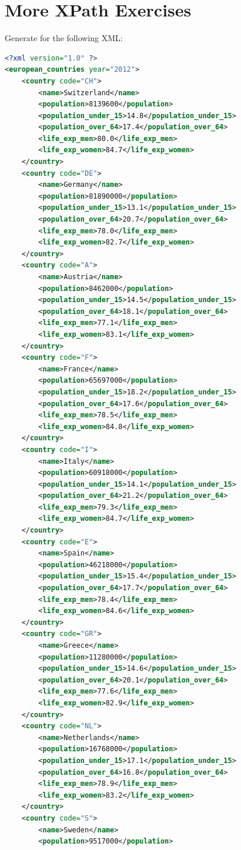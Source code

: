 \section{More XPath Exercises}
Generate for the following XML:
\begin{center}
\begin{lstlisting}[language=XML]
<?xml version="1.0" ?>
<european_countries year="2012">
	<country code="CH">
		<name>Switzerland</name>
		<population>8139600</population>
		<population_under_15>14.8</population_under_15>
		<population_over_64>17.4</population_over_64>
		<life_exp_men>80.0</life_exp_men>
		<life_exp_women>84.7</life_exp_women>
	</country>
	<country code="DE">
		<name>Germany</name>
		<population>81890000</population>
		<population_under_15>13.1</population_under_15>
		<population_over_64>20.7</population_over_64>
		<life_exp_men>78.0</life_exp_men>
		<life_exp_women>82.7</life_exp_women>
	</country>
	<country code="A">
		<name>Austria</name>
		<population>8462000</population>
		<population_under_15>14.5</population_under_15>
		<population_over_64>18.1</population_over_64>
		<life_exp_men>77.1</life_exp_men>
		<life_exp_women>83.1</life_exp_women>
	</country>
	<country code="F">
		<name>France</name>
		<population>65697000</population>
		<population_under_15>18.2</population_under_15>
		<population_over_64>17.6</population_over_64>
		<life_exp_men>78.5</life_exp_men>
		<life_exp_women>84.8</life_exp_women>
	</country>
	<country code="I">
		<name>Italy</name>
		<population>60918000</population>
		<population_under_15>14.1</population_under_15>
		<population_over_64>21.2</population_over_64>
		<life_exp_men>79.3</life_exp_men>
		<life_exp_women>84.7</life_exp_women>
	</country>
	<country code="E">
		<name>Spain</name>
		<population>46218000</population>
		<population_under_15>15.4</population_under_15>
		<population_over_64>17.7</population_over_64>
		<life_exp_men>78.4</life_exp_men>
		<life_exp_women>84.6</life_exp_women>
	</country>
	<country code="GR">
		<name>Greece</name>
		<population>11280000</population>
		<population_under_15>14.6</population_under_15>
		<population_over_64>20.1</population_over_64>
		<life_exp_men>77.6</life_exp_men>
		<life_exp_women>82.9</life_exp_women>
	</country>
	<country code="NL">
		<name>Netherlands</name>
		<population>16768000</population>
		<population_under_15>17.1</population_under_15>
		<population_over_64>16.8</population_over_64>
		<life_exp_men>78.9</life_exp_men>
		<life_exp_women>83.2</life_exp_women>
	</country>
	<country code="S">
		<name>Sweden</name>
		<population>9517000</population>

\end{lstlisting}
\end{center}
